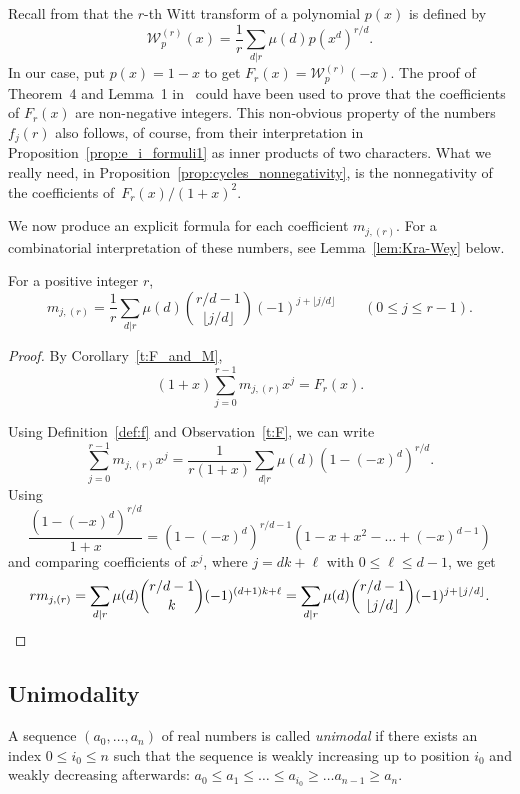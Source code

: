 \documentclass[ALCO,published]{cedram}
\begin{document}
\begin{remark}
    Recall from \cite{Moree} that the $r$-th Witt transform of a polynomial $p(x)$ is defined by 
    \[
        \mathcal{W}_p^{(r)}(x)=\frac{1}{r}\sum_{d|r}\mu(d)p(x^d)^{r/d}.
    \] 
    In our case, put $p(x)=1-x$ to get $F_r(x) = \mathcal{W}_p^{(r)}(-x)$. 
    The proof of Theorem~4 and Lemma~1 in~\cite{Moree} could have been used to prove that the coefficients of $F_r(x)$ are non-negative integers. This non-obvious property of the numbers $f_j(r)$ also follows, of course, from their interpretation in Proposition~\ref{prop:e_i_formuli1} as inner products of two characters.
    What we really need, in Proposition~\ref{prop:cycles_nonnegativity}, is the nonnegativity of the coefficients of~$F_r(x)/(1+x)^2$.
\end{remark}

We now produce an explicit formula for each coefficient $m_{j,(r)}$. For a combinatorial interpretation of these numbers, see Lemma~\ref{lem:Kra-Wey} below.

\begin{lemma}\label{t:m_formula}
    For a positive integer $r$,
    \[
		m_{j,(r)}
		= \frac{1}{r} \sum_{d|r} \mu(d) \binom{r/d - 1}{\lfloor j/d \rfloor}  (-1)^{j+\lfloor j/d \rfloor} 
		\qquad (0 \le j \le r-1).
    \]
\end{lemma}
\begin{proof}
	By Corollary~\ref{t:F_and_M},
	\[
	    (1+x) \sum_{j=0}^{r-1} m_{j,(r)}x^j=F_r(x). 
	\]
	
	Using Definition~\ref{def:f} and Observation~\ref{t:F},
	we can write
	\[
	    \sum_{j=0}^{r-1} m_{j,(r)} x^j 
	    = \frac{1}{r(1+x)} \sum_{d|r} \mu(d) (1-(-x)^d)^{r/d}.
    \]
	Using
	\[
		\frac{(1-(-x)^d)^{r/d}}{1+x} 
		= (1-(-x)^d)^{r/d-1} (1 - x + x^2 - \ldots +(-x)^{d-1})
	\]
	and comparing coefficients of $x^j$, where $j = dk + \ell$ with $0 \le \ell \le d-1$, we get
	\[
		r m_{j,(r)}
		= \sum_{d|r} \mu(d) \binom{r/d - 1}{k}  (-1)^{(d+1)k + \ell}
		= \sum_{d|r} \mu(d) \binom{r/d - 1}{\lfloor j/d \rfloor}  (-1)^{j+\lfloor j/d \rfloor}.
        \qedhere
	\]
\end{proof}


\subsection{Unimodality}
\label{sec:unimodality}
	
A sequence $(a_0,\ldots,a_n)$ of real numbers is called {\em unimodal} if there exists an index $0 \le i_0 \le n$ such that the sequence is weakly increasing up to position $i_0$ and weakly decreasing afterwards:
$a_0 \le a_1 \le \ldots \le a_{i_0} \ge \ldots a_{n-1} \ge a_n$.
	
\end{document}
